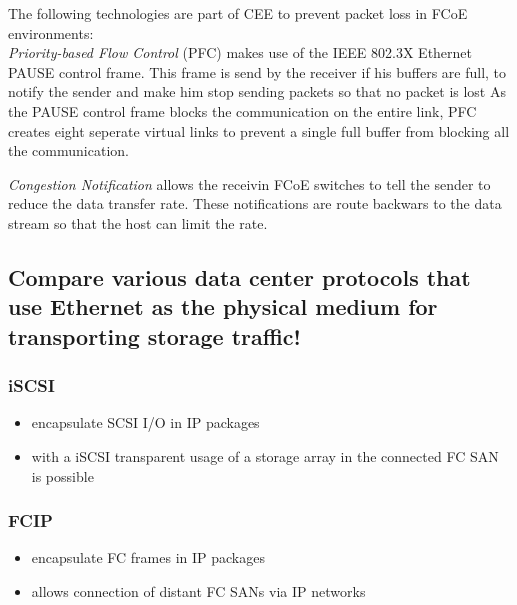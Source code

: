 	The following technologies are part of CEE to prevent packet loss in FCoE environments:\\
	\emph{Priority-based Flow Control} (PFC) makes use of the IEEE 802.3X Ethernet PAUSE control frame.
	This frame is send by the receiver if his buffers are full,
	to notify the sender and make him stop sending packets
	so that no packet is lost
	As the PAUSE control frame blocks the communication on the entire link,
	PFC creates eight seperate virtual links to prevent a single full buffer from blocking
	all the communication.

	\emph{Congestion Notification} allows the receivin FCoE switches to tell the sender to
	reduce the data transfer rate.
	These notifications are route backwars to the data stream so that the host can limit the rate.

\subsection{Compare various data center protocols that use Ethernet as the physical medium for transporting storage traffic!} %
\label{sub:compare_various_data_center_protocols_that_use_ethernet_as_the_physical_medium_for_transporting_storage_traffic}
	\subsubsection{iSCSI} %
	\label{ssub:iscsi}
		\begin{itemize}
			\item encapsulate SCSI I/O in IP packages
			\item with a iSCSI transparent usage of a storage array in the connected FC SAN is possible
		\end{itemize}
	\subsubsection{FCIP} %
	\label{ssub:fcip}
		\begin{itemize}
			\item encapsulate FC frames in IP packages
			\item allows connection of distant FC SANs via IP networks
		\end{itemize}
